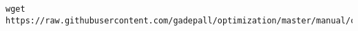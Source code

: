 \documentclass[journal,12pt,twocolumn]{IEEEtran}
\renewcommand\thesection{\arabic{section}}
\begin{document}
\begin{enumerate}[label=\thesection.\arabic*,ref=\thesection.\theenumi]
\solution
%	
\begin{lstlisting}
wget https://raw.githubusercontent.com/gadepall/optimization/master/manual/codes/2.3.py
\end{lstlisting}
\end{enumerate}
\fi
\end{document}
